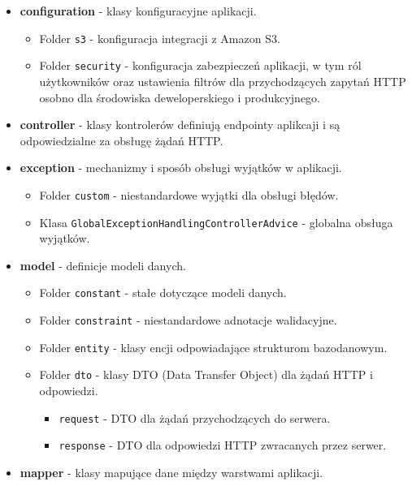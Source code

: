 \documentclass[../../main.tex]{subfiles}
\begin{document}
    \begin{itemize}
        \item \textbf{configuration} - klasy konfiguracyjne aplikacji.
        \begin{itemize}
            \item Folder \texttt{s3} - konfiguracja integracji z Amazon S3.
            \item Folder \texttt{security} - konfiguracja zabezpieczeń aplikacji, w tym ról użytkowników oraz ustawienia filtrów dla przychodzących zapytań HTTP osobno dla środowiska deweloperskiego i produkcyjnego.
        \end{itemize}
        \item \textbf{controller} - klasy kontrolerów definiują endpointy aplikcaji i są odpowiedzialne za obsługę żądań HTTP.
        \item \textbf{exception} - mechanizmy i sposób obsługi wyjątków w aplikacji.
        \begin{itemize}
            \item Folder \texttt{custom} - niestandardowe wyjątki dla obsługi błędów.
            \item Klasa \texttt{GlobalExceptionHandlingControllerAdvice} - globalna obsługa wyjątków.
        \end{itemize}
        \item \textbf{model} - definicje modeli danych.
        \begin{itemize}
            \item Folder \texttt{constant} - stałe dotyczące modeli danych.
            \item Folder \texttt{constraint} - niestandardowe adnotacje walidacyjne.
            \item Folder \texttt{entity} - klasy encji odpowiadające strukturom bazodanowym.
            \item Folder \texttt{dto} - klasy DTO (Data Transfer Object) dla żądań HTTP i odpowiedzi.
            \begin{itemize}
                \item \texttt{request} - DTO dla żądań przychodzących do serwera.
                \item \texttt{response} - DTO dla odpowiedzi HTTP zwracanych przez serwer.
            \end{itemize}
        \end{itemize}
        \item \textbf{mapper} - klasy mapujące dane między warstwami aplikacji.

\end{itemize}
\end{document}
